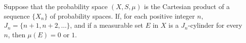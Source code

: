 Suppose that the probability space $(X, S, \mu)$ is the Cartesian product of a sequence $\{X_n\}$ of probability spaces. If, for each positive integer $n$, $J_n = \{n+1, n+2, \dots\}$, and if a measurable set $E$ in $X$ is a $J_n$-cylinder for every $n$, then $\mu(E) = 0$ or $1$.

